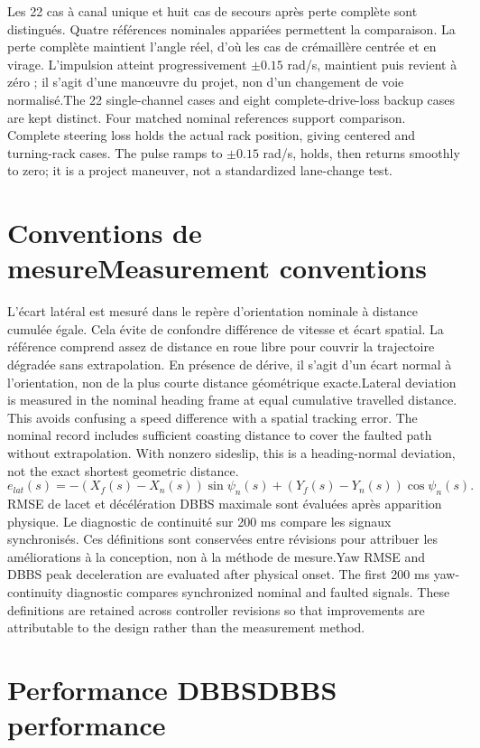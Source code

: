 \documentclass[11pt,a4paper,oneside]{report}
\newcommand{\bi}[2]{\iffrench #2\else #1\fi}
\renewcommand{\sec}[2]{\section{\bi{#1}{#2}}}
\begin{document}
\bi{The 22 single-channel cases and eight complete-drive-loss backup cases are kept distinct. Four matched nominal references support comparison. Complete steering loss holds the actual rack position, giving centered and turning-rack cases. The pulse ramps to $\pm0.15$ rad/s, holds, then returns smoothly to zero; it is a project maneuver, not a standardized lane-change test.}{Les 22 cas à canal unique et huit cas de secours après perte complète sont distingués. Quatre références nominales appariées permettent la comparaison. La perte complète maintient l'angle réel, d'où les cas de crémaillère centrée et en virage. L'impulsion atteint progressivement $\pm0.15$ rad/s, maintient puis revient à zéro ; il s'agit d'une man\oe{}uvre du projet, non d'un changement de voie normalisé.}
\sec{Measurement conventions}{Conventions de mesure}
\bi{Lateral deviation is measured in the nominal heading frame at equal cumulative travelled distance. This avoids confusing a speed difference with a spatial tracking error. The nominal record includes sufficient coasting distance to cover the faulted path without extrapolation. With nonzero sideslip, this is a heading-normal deviation, not the exact shortest geometric distance.}{L'écart latéral est mesuré dans le repère d'orientation nominale à distance cumulée égale. Cela évite de confondre différence de vitesse et écart spatial. La référence comprend assez de distance en roue libre pour couvrir la trajectoire dégradée sans extrapolation. En présence de dérive, il s'agit d'un écart normal à l'orientation, non de la plus courte distance géométrique exacte.}
\[
e_{lat}(s)=-(X_f(s)-X_n(s))\sin\psi_n(s)+(Y_f(s)-Y_n(s))\cos\psi_n(s).
\]
\bi{Yaw RMSE and DBBS peak deceleration are evaluated after physical onset. The first 200 ms yaw-continuity diagnostic compares synchronized nominal and faulted signals. These definitions are retained across controller revisions so that improvements are attributable to the design rather than the measurement method.}{RMSE de lacet et décélération DBBS maximale sont évaluées après apparition physique. Le diagnostic de continuité sur 200 ms compare les signaux synchronisés. Ces définitions sont conservées entre révisions pour attribuer les améliorations à la conception, non à la méthode de mesure.}
\sec{DBBS performance}{Performance DBBS}
\end{document}
